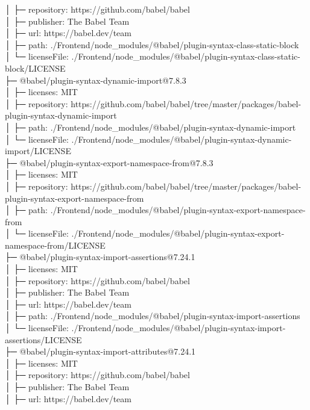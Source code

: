 │  ├─ repository: https://github.com/babel/babel\\
│  ├─ publisher: The Babel Team\\
│  ├─ url: https://babel.dev/team\\
│  ├─ path: ./Frontend/node\_modules/@babel/plugin-syntax-class-static-block\\
│  └─ licenseFile: ./Frontend/node\_modules/@babel/plugin-syntax-class-static-block/LICENSE\\
├─ @babel/plugin-syntax-dynamic-import@7.8.3\\
│  ├─ licenses: MIT\\
│  ├─ repository: https://github.com/babel/babel/tree/master/packages/babel-plugin-syntax-dynamic-import\\
│  ├─ path: ./Frontend/node\_modules/@babel/plugin-syntax-dynamic-import\\
│  └─ licenseFile: ./Frontend/node\_modules/@babel/plugin-syntax-dynamic-import/LICENSE\\
├─ @babel/plugin-syntax-export-namespace-from@7.8.3\\
│  ├─ licenses: MIT\\
│  ├─ repository: https://github.com/babel/babel/tree/master/packages/babel-plugin-syntax-export-namespace-from\\
│  ├─ path: ./Frontend/node\_modules/@babel/plugin-syntax-export-namespace-from\\
│  └─ licenseFile: ./Frontend/node\_modules/@babel/plugin-syntax-export-namespace-from/LICENSE\\
├─ @babel/plugin-syntax-import-assertions@7.24.1\\
│  ├─ licenses: MIT\\
│  ├─ repository: https://github.com/babel/babel\\
│  ├─ publisher: The Babel Team\\
│  ├─ url: https://babel.dev/team\\
│  ├─ path: ./Frontend/node\_modules/@babel/plugin-syntax-import-assertions\\
│  └─ licenseFile: ./Frontend/node\_modules/@babel/plugin-syntax-import-assertions/LICENSE\\
├─ @babel/plugin-syntax-import-attributes@7.24.1\\
│  ├─ licenses: MIT\\
│  ├─ repository: https://github.com/babel/babel\\
│  ├─ publisher: The Babel Team\\
│  ├─ url: https://babel.dev/team\\
